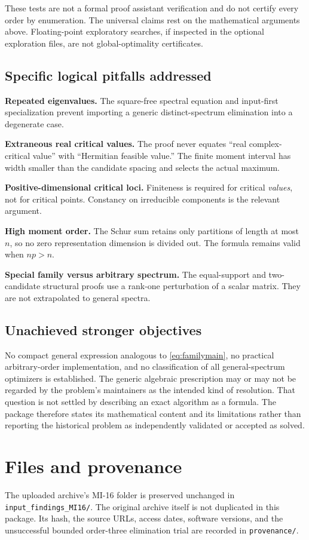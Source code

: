 \documentclass[11pt]{article}
\theoremstyle{definition}\newtheorem{definition}[theorem]{Definition}
\theoremstyle{remark}\newtheorem{remark}[theorem]{Remark}
\begin{document}
These tests are not a formal proof assistant verification and do not certify every order by enumeration. The universal claims rest on the mathematical arguments above. Floating-point exploratory searches, if inspected in the optional exploration files, are not global-optimality certificates.

\subsection{Specific logical pitfalls addressed}
\textbf{Repeated eigenvalues.} The square-free spectral equation and input-first specialization prevent importing a generic distinct-spectrum elimination into a degenerate case.

\textbf{Extraneous real critical values.} The proof never equates ``real complex-critical value'' with ``Hermitian feasible value.'' The finite moment interval has width smaller than the candidate spacing and selects the actual maximum.

\textbf{Positive-dimensional critical loci.} Finiteness is required for critical \emph{values}, not for critical points. Constancy on irreducible components is the relevant argument.

\textbf{High moment order.} The Schur sum retains only partitions of length at most $n$, so no zero representation dimension is divided out. The formula remains valid when $np>n$.

\textbf{Special family versus arbitrary spectrum.} The equal-support and two-candidate structural proofs use a rank-one perturbation of a scalar matrix. They are not extrapolated to general spectra.

\subsection{Unachieved stronger objectives}
No compact general expression analogous to \eqref{eq:familymain}, no practical arbitrary-order implementation, and no classification of all general-spectrum optimizers is established. The generic algebraic prescription may or may not be regarded by the problem's maintainers as the intended kind of resolution. That question is not settled by describing an exact algorithm as a formula. The package therefore states its mathematical content and its limitations rather than reporting the historical problem as independently validated or accepted as solved.

\section{Files and provenance}
The uploaded archive's MI-16 folder is preserved unchanged in \texttt{input\_findings\_MI16/}. The original archive itself is not duplicated in this package. Its hash, the source URLs, access dates, software versions, and the unsuccessful bounded order-three elimination trial are recorded in \texttt{provenance/}.
\end{document}
